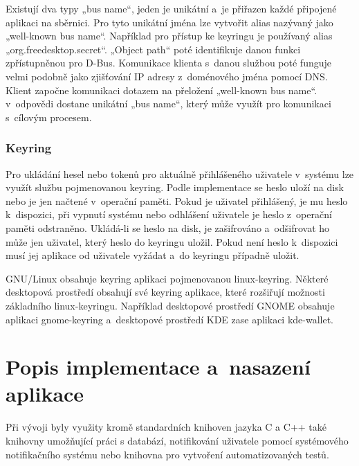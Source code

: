 Existují dva typy „bus name“, jeden je unikátní a je přiřazen každé připojené aplikaci na sběrnici. Pro tyto unikátní jména lze vytvořit alias nazývaný jako
„well-known bus name“. Například pro přístup ke keyringu je používaný alias „org.freedesktop.secret“. „Object path“ poté identifikuje danou funkci zpřístupněnou 
pro D-Bus. Komunikace klienta s danou službou poté funguje velmi podobně jako zjišťování IP adresy z doménového jména pomocí DNS. Klient započne komunikaci dotazem
na přeložení „well-known bus name“. v odpovědi dostane unikátní „bus name“, který může využít pro komunikaci s cílovým procesem. \cite{DBus}

\subsection{Keyring}

Pro ukládání hesel nebo tokenů pro aktuálně přihlášeného uživatele v systému lze využít službu pojmenovanou keyring. Podle implementace se heslo uloží na disk
nebo je jen načtené v operační paměti. Pokud je uživatel přihlášený, je mu heslo k dispozici, při vypnutí systému nebo odhlášení uživatele je heslo z operační paměti
odstraněno. Ukládá-li se heslo na disk, je zašifrováno a odšifrovat ho může jen uživatel, který heslo do keyringu uložil. Pokud není heslo k dispozici musí jej aplikace 
od uživatele vyžádat a do keyringu případně uložit. \cite{Keyring}

GNU/Linux obsahuje keyring aplikaci pojmenovanou linux-keyring. Některé desktopová prostředí obsahují své keyring aplikace, které rozšiřují možnosti základního linux-keyringu.
Například desktopové prostředí GNOME obsahuje aplikaci gnome-keyring a desktopové prostředí KDE zase aplikaci kde-wallet. \cite{Keyring}

\chapter{Popis implementace a nasazení aplikace}

Při vývoji byly využity kromě standardních knihoven jazyka C a C++ také knihovny umožňující práci s databází, notifikování uživatele pomocí 
systémového notifikačního systému nebo knihovna pro vytvoření automatizovaných testů.

